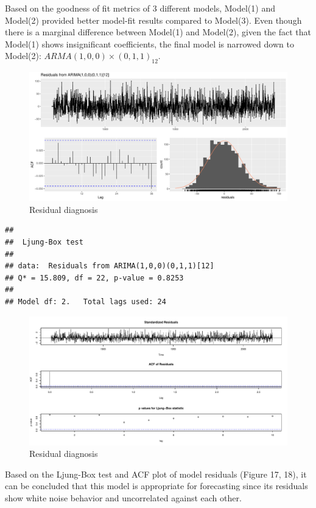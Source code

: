\documentclass[
  11pt,
]{article}
\begin{document}
Based on the goodness of fit metrics of 3 different models, Model(1) and
Model(2) provided better model-fit results compared to Model(3). Even
though there is a marginal difference between Model(1) and Model(2),
given the fact that Model(1) shows insignificant coefficients, the final
model is narrowed down to Model(2): \(ARMA(1,0,0)\times(0,1,1)_{12}\).

\begin{figure}
\centering
\includegraphics{ST422_files/figure-latex/unnamed-chunk-26-1.pdf}
\caption{Residual diagnosis}
\end{figure}

\begin{verbatim}
## 
##  Ljung-Box test
## 
## data:  Residuals from ARIMA(1,0,0)(0,1,1)[12]
## Q* = 15.809, df = 22, p-value = 0.8253
## 
## Model df: 2.   Total lags used: 24
\end{verbatim}

\begin{figure}
\centering
\includegraphics{ST422_files/figure-latex/unnamed-chunk-26-2.pdf}
\caption{Residual diagnosis}
\end{figure}

Based on the Ljung-Box test and ACF plot of model residuals (Figure 17,
18), it can be concluded that this model is appropriate for forecasting
since its residuals show white noise behavior and uncorrelated against
each other.
\end{document}
